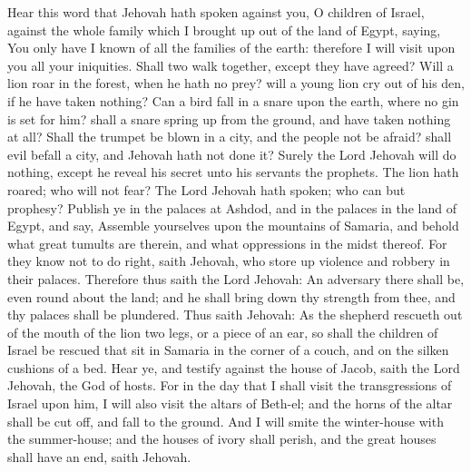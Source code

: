 Hear this word that Jehovah hath spoken against you, O children of Israel, against the whole family which I brought up out of the land of Egypt, saying, You only have I known of all the families of the earth: therefore I will visit upon you all your iniquities. Shall two walk together, except they have agreed? Will a lion roar in the forest, when he hath no prey? will a young lion cry out of his den, if he have taken nothing? Can a bird fall in a snare upon the earth, where no gin is set for him? shall a snare spring up from the ground, and have taken nothing at all? Shall the trumpet be blown in a city, and the people not be afraid? shall evil befall a city, and Jehovah hath not done it? Surely the Lord Jehovah will do nothing, except he reveal his secret unto his servants the prophets. The lion hath roared; who will not fear? The Lord Jehovah hath spoken; who can but prophesy?  Publish ye in the palaces at Ashdod, and in the palaces in the land of Egypt, and say, Assemble yourselves upon the mountains of Samaria, and behold what great tumults are therein, and what oppressions in the midst thereof. For they know not to do right, saith Jehovah, who store up violence and robbery in their palaces. Therefore thus saith the Lord Jehovah: An adversary there shall be, even round about the land; and he shall bring down thy strength from thee, and thy palaces shall be plundered. Thus saith Jehovah: As the shepherd rescueth out of the mouth of the lion two legs, or a piece of an ear, so shall the children of Israel be rescued that sit in Samaria in the corner of a couch, and on the silken cushions of a bed.  Hear ye, and testify against the house of Jacob, saith the Lord Jehovah, the God of hosts. For in the day that I shall visit the transgressions of Israel upon him, I will also visit the altars of Beth-el; and the horns of the altar shall be cut off, and fall to the ground. And I will smite the winter-house with the summer-house; and the houses of ivory shall perish, and the great houses shall have an end, saith Jehovah. 

